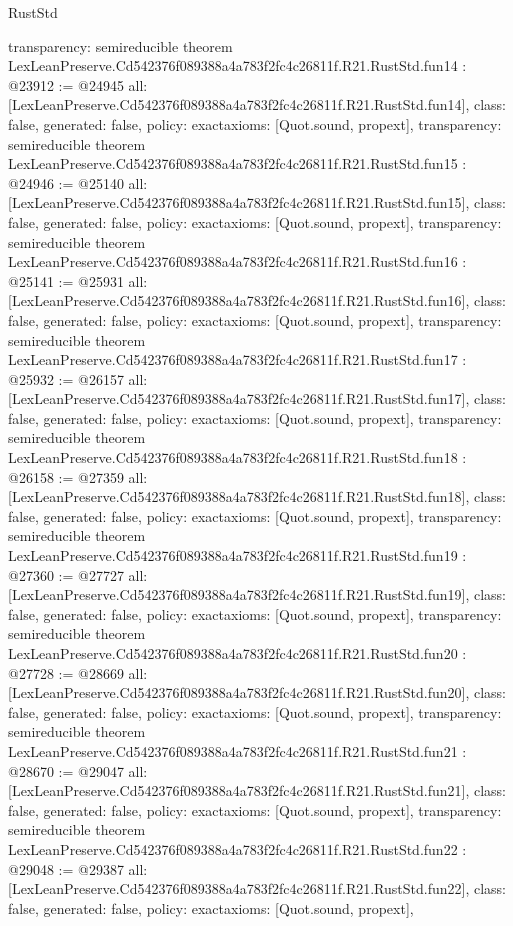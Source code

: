\begin{lexlean}{RustStd}
\begin{coremodule}
{  transparency: semireducible
}
theorem LexLeanPreserve.Cd542376f089388a4a783f2fc4c26811f.R21.RustStd.fun14 : @23912 := @24945 {
  all: [LexLeanPreserve.Cd542376f089388a4a783f2fc4c26811f.R21.RustStd.fun14],
  class: false,
  generated: false,
  policy: exact{axioms: [Quot.sound, propext]},
  transparency: semireducible
}
theorem LexLeanPreserve.Cd542376f089388a4a783f2fc4c26811f.R21.RustStd.fun15 : @24946 := @25140 {
  all: [LexLeanPreserve.Cd542376f089388a4a783f2fc4c26811f.R21.RustStd.fun15],
  class: false,
  generated: false,
  policy: exact{axioms: [Quot.sound, propext]},
  transparency: semireducible
}
theorem LexLeanPreserve.Cd542376f089388a4a783f2fc4c26811f.R21.RustStd.fun16 : @25141 := @25931 {
  all: [LexLeanPreserve.Cd542376f089388a4a783f2fc4c26811f.R21.RustStd.fun16],
  class: false,
  generated: false,
  policy: exact{axioms: [Quot.sound, propext]},
  transparency: semireducible
}
theorem LexLeanPreserve.Cd542376f089388a4a783f2fc4c26811f.R21.RustStd.fun17 : @25932 := @26157 {
  all: [LexLeanPreserve.Cd542376f089388a4a783f2fc4c26811f.R21.RustStd.fun17],
  class: false,
  generated: false,
  policy: exact{axioms: [Quot.sound, propext]},
  transparency: semireducible
}
theorem LexLeanPreserve.Cd542376f089388a4a783f2fc4c26811f.R21.RustStd.fun18 : @26158 := @27359 {
  all: [LexLeanPreserve.Cd542376f089388a4a783f2fc4c26811f.R21.RustStd.fun18],
  class: false,
  generated: false,
  policy: exact{axioms: [Quot.sound, propext]},
  transparency: semireducible
}
theorem LexLeanPreserve.Cd542376f089388a4a783f2fc4c26811f.R21.RustStd.fun19 : @27360 := @27727 {
  all: [LexLeanPreserve.Cd542376f089388a4a783f2fc4c26811f.R21.RustStd.fun19],
  class: false,
  generated: false,
  policy: exact{axioms: [Quot.sound, propext]},
  transparency: semireducible
}
theorem LexLeanPreserve.Cd542376f089388a4a783f2fc4c26811f.R21.RustStd.fun20 : @27728 := @28669 {
  all: [LexLeanPreserve.Cd542376f089388a4a783f2fc4c26811f.R21.RustStd.fun20],
  class: false,
  generated: false,
  policy: exact{axioms: [Quot.sound, propext]},
  transparency: semireducible
}
theorem LexLeanPreserve.Cd542376f089388a4a783f2fc4c26811f.R21.RustStd.fun21 : @28670 := @29047 {
  all: [LexLeanPreserve.Cd542376f089388a4a783f2fc4c26811f.R21.RustStd.fun21],
  class: false,
  generated: false,
  policy: exact{axioms: [Quot.sound, propext]},
  transparency: semireducible
}
theorem LexLeanPreserve.Cd542376f089388a4a783f2fc4c26811f.R21.RustStd.fun22 : @29048 := @29387 {
  all: [LexLeanPreserve.Cd542376f089388a4a783f2fc4c26811f.R21.RustStd.fun22],
  class: false,
  generated: false,
  policy: exact{axioms: [Quot.sound, propext]},
}
\end{coremodule}
\end{lexlean}
